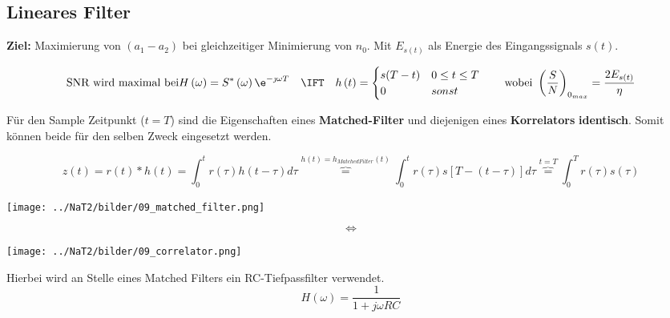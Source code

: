 \subsection{Lineares Filter}
 \label{09_matched_filter}
	\textbf{Ziel: } Maximierung von $(a_1 - a_2)$ bei gleichzeitiger Minimierung
	von $n_0$. Mit $E_{s(t)}$ als Energie des Eingangssignals $s(t)$.
 
	$$\text{SNR wird maximal bei} H \left( \omega \right) = S^* \left( \omega
	\right) \e^{-\jmath \omega T} \quad \IFT \quad h \left( t \right) = 
	\begin{cases} s(T-t) & 0 \leq t \leq T \\
	0 & sonst\end{cases} \qquad \text{wobei } \left(\dfrac{S}{N}\right)_{0_{max}} =
	\dfrac{2E_{s(t)}}{\eta}$$
 	

 \label{09_korrelator}
Für den Sample Zeitpunkt ($t=T$) sind die Eigenschaften eines \textbf{Matched-Filter} und diejenigen eines
\textbf{Korrelators} \textbf{identisch}. Somit können beide für den selben Zweck eingesetzt werden.

$$ z(t) = r(t) \ast h(t) = \int_0^t r(\tau) h(t-\tau) d\tau \overbrace{=}^{h(t) =
h_{MatchedFilter}(t)} \int_0^t r(\tau) s[T - (t - \tau)] d\tau \overbrace{=}^{t = T} \int_0^T
r(\tau)s(\tau)$$

	\begin{center}
		\begin{minipage}[c]{4.5cm}
			\texttt{[image: ../NaT2/bilder/09\_matched\_filter.png]}
		\end{minipage}
		\begin{minipage}[c]{2cm}		
			$$\Longleftrightarrow $$
		\end{minipage}
		\begin{minipage}[c]{4.5cm}
			\texttt{[image: ../NaT2/bilder/09\_correlator.png]}
		\end{minipage}
	\end{center}

Hierbei wird an Stelle eines Matched Filters ein RC-Tiefpassfilter verwendet. \\
$$H(\omega) = \dfrac{1}{1 + j \omega R C}$$

